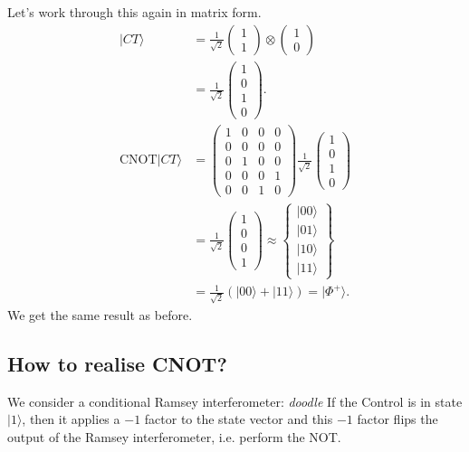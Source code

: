 \documentclass[lasers.tex]{subfiles}
\begin{document}
\begin{example}
    Let's work through this again in matrix form.
    \begin{align}
        |CT\rangle &= \frac{1}{\sqrt{2}}\begin{pmatrix} 1 \\ 1\end{pmatrix}\otimes\begin{pmatrix}1\\0\end{pmatrix} \\
                   &= \frac{1}{\sqrt{2}}\begin{pmatrix} 1\\0\\1\\0\end{pmatrix}. \\
        \text{CNOT}|CT\rangle &= \begin{pmatrix} 1 & 0 & 0 & 0 \\ 0 & 0 & 0 & 0 \\ 0 & 1 & 0 & 0 \\ 0 & 0 & 0 & 1 \\ 0 & 0 & 1 & 0 \end{pmatrix}\frac{1}{\sqrt{2}}\begin{pmatrix}1\\0\\1\\0\end{pmatrix}\\
                              &= \frac{1}{\sqrt{2}}\begin{pmatrix}1\\0\\0\\1\end{pmatrix} \approx \begin{Bmatrix} |00\rangle \\ |01\rangle \\ |10\rangle \\ |11\rangle\end{Bmatrix} \\
                              &= \frac{1}{\sqrt{2}}\left(|00\rangle+|11\rangle\right) = |\Phi^+\rangle.
    \end{align}
    We get the same result as before. 
\end{example}

\subsection{How to realise CNOT?}
We consider a conditional Ramsey interferometer:
\textit{doodle}
If the Control is in state $|1\rangle$, then it applies a $-1$ factor to the state vector and this $-1$ factor flips the output of the Ramsey interferometer, i.e. perform the NOT.
\end{document}
